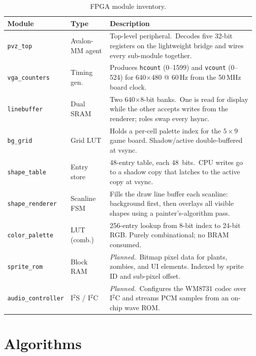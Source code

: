 \documentclass[11pt,letterpaper]{article}
\begin{document}
\begin{table}[H]
\centering
\caption{FPGA module inventory.}
\label{tab:modules}
\begin{tabularx}{\textwidth}{l l X}
\toprule
\textbf{Module} & \textbf{Type} & \textbf{Description} \\
\midrule
\texttt{pvz\_top}        & Avalon-MM agent
  & Top-level peripheral.\ Decodes five 32-bit registers on the lightweight
    bridge and wires every sub-module together. \\
\texttt{vga\_counters}   & Timing gen.
  & Produces \texttt{hcount} (0--1599) and \texttt{vcount} (0--524) for
    640$\times$480 @ 60\,Hz from the 50\,MHz board clock. \\
\texttt{linebuffer}      & Dual SRAM
  & Two 640$\times$8-bit banks.\ One is read for display while the other
    accepts writes from the renderer; roles swap every hsync. \\
\texttt{bg\_grid}        & Grid LUT
  & Holds a per-cell palette index for the $5 \times 9$ game board.
    Shadow/active double-buffered at vsync. \\
\texttt{shape\_table}    & Entry store
  & 48-entry table, each 48~bits.\ CPU writes go to a shadow copy that
    latches to the active copy at vsync. \\
\texttt{shape\_renderer} & Scanline FSM
  & Fills the draw line buffer each scanline: background first, then
    overlays all visible shapes using a painter's-algorithm pass. \\
\texttt{color\_palette}  & LUT (comb.)
  & 256-entry lookup from 8-bit index to 24-bit RGB.  Purely
    combinational; no BRAM consumed. \\
\texttt{sprite\_rom}     & Block RAM
  & \emph{Planned.}\ Bitmap pixel data for plants, zombies, and UI
    elements. Indexed by sprite ID and sub-pixel offset. \\
\texttt{audio\_controller} & I$^2$S / I$^2$C
  & \emph{Planned.}\ Configures the WM8731 codec over I$^2$C and streams
    PCM samples from an on-chip wave ROM. \\
\bottomrule
\end{tabularx}
\end{table}

\section{Algorithms}
\label{sec:algorithms}
\end{document}
